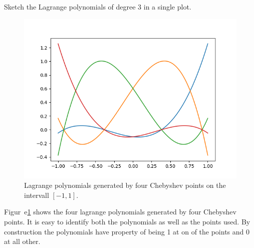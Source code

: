 \begin{problem}
  Sketch the Lagrange polynomials of degree 3 in a single plot.
\end{problem}

\begin{solution}
  \begin{figure}[!ht]
    \centering
    \includegraphics[scale = 0.5]{./code/task_3.png}
    \caption{Lagrange polynomials generated by four Chebyshev points on
      the intervall $[-1, 1]$.}
    \label{fig:3}
  \end{figure}
  Figur~e\ref{fig:3} shows the four lagrange polynomials generated
  by four Chebyshev points. It is easy to identify both the polynomials
  as well as the points used. By construction the polynomials have
  property of being 1 at on of the points and 0 at all other.
\end{solution}

